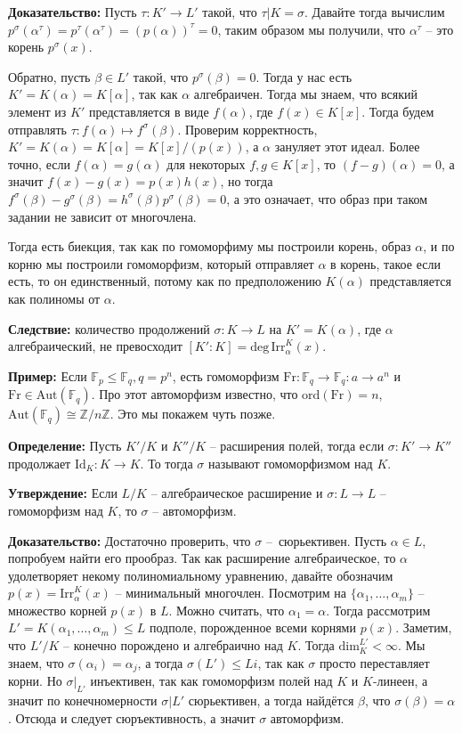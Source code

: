 \documentclass[a4paper, 12pt]{book}
\begin{document}
\textbf{Доказательство:} Пусть $\tau:K'\rightarrow L'$ такой, что
$\tau|K=\sigma$. Давайте тогда вычислим $p^\sigma(\alpha^\tau)=p^\tau(\alpha
^\tau)=(p(\alpha))^\tau=0$, таким образом мы получили, что $\alpha^\tau$ – это
корень $p^\sigma(x)$.

Обратно, пусть $\beta\in L'$ такой, что $p^\sigma(\beta)=0$. Тогда у нас есть
$K'=K(\alpha)=K[\alpha]$, так как $\alpha$ алгебраичен. Тогда мы знаем, что
всякий элемент из $K'$ представляется в виде $f(\alpha)$, где $f(x)\in K[x]$.
Тогда будем отправлять $\tau:f(\alpha)\mapsto f^\sigma(\beta)$. Проверим
корректность, $K'=K(\alpha)=K[\alpha]=K[x]/(p(x))$, а $\alpha$ зануляет этот
идеал. Более точно, если $f(\alpha)=g(\alpha)$ для некоторых $f,g\in K[x]$, то
$(f-g)(\alpha)=0$, а значит $f(x)-g(x)=p(x)h(x)$, но тогда $f^\sigma(\beta)-g^
\sigma(\beta)=h^\sigma(\beta)p^\sigma(\beta)=0$, а это означает, что образ при
таком задании не зависит от многочлена. 

Тогда есть биекция, так как по гомоморфиму мы построили корень, образ $\alpha$,
и по корню мы построили гомоморфизм, который отправляет $\alpha$ в корень,
такое если есть, то он единственный, потому как по предположению $K(\alpha)$
представляется как полиномы от $\alpha$.

\textbf{Следствие:} количество продолжений $\sigma:K\rightarrow L$ на
$K'=K(\alpha)$, где $\alpha$ алгебраический, не превосходит $[K':K]=\text{deg}\,
\text{Irr}_\alpha^K(x)$.

\textbf{Пример:} Если $\mathbb{F}_p\le\mathbb{F}_q,q=p^n$, есть гомоморфизм
$\text{Fr}:\mathbb{F}_q\rightarrow\mathbb{F}_q:a\rightarrow a^n$ и $\text{Fr}
\in\text{Aut}(\mathbb{F}_q)$. Про этот автоморфизм известно, что $\text{ord}
(\text{Fr})=n$, $\text{Aut}(\mathbb{F}_q)\cong\mathbb{Z}/n\mathbb{Z}$. Это мы
покажем чуть позже.

\textbf{Определение:} Пусть $K'/K$ и $K''/K$ – расширения полей, тогда если
$\sigma:K'\rightarrow K''$ продолжает $\text{Id}_K:K\rightarrow K$. То тогда
$\sigma$ называют гомоморфизмом над $K$.

\textbf{Утверждение:} Если $L/K$ – алгебраическое расширение и $\sigma:L
\rightarrow L$ – гомоморфизм над $K$, то $\sigma$ – автоморфизм.

\textbf{Доказательство:} Достаточно проверить, что $\sigma$ – сюрьективен.
Пусть $\alpha\in L$, попробуем найти его прообраз. Так как расширение
алгебраическое, то $\alpha$ удолетворяет некому полиномиальному уравнению,
давайте обозначим $p(x)=\text{Irr}_\alpha^K(x)$ – минимальный многочлен.
Посмотрим на $\{\alpha_1,\ldots,\alpha_m\}$ – множество корней $p(x)$ в $L$.
Можно считать, что $\alpha_1=\alpha$. Тогда рассмотрим $L'=K(\alpha_1,\ldots,
\alpha_m)\le L$ подполе, порожденное всеми корнями $p(x)$. Заметим, что $L'/K$
– конечно порождено и алгебраично над $K$. Тогда $\text{dim}_K^{L'}<\infty$.
Мы знаем, что $\sigma(\alpha_i)=\alpha_j$, а тогда $\sigma(L')\le Li$, так как
$\sigma$ просто переставляет корни. Но $\sigma|_{L'}$ инъективен, так как
гомоморфизм полей над $K$ и $K$-линеен, а значит по конечномерности $\sigma|L'$
сюрьективен, а тогда найдётся $\beta$, что $\sigma(\beta)=\alpha$. Отсюда и
следует сюръективность, а значит $\sigma$ автоморфизм.
\end{document}
